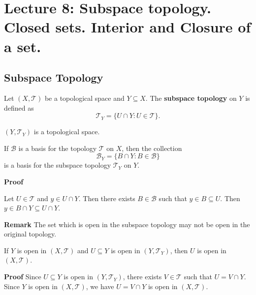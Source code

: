\documentclass[main.tex]{subfiles}
\begin{document}
\pagestyle{plain}
\setcounter{chapter}{7}

\chapter{Lecture 8: Subspace topology. Closed sets. Interior and Closure of a set. }
\label{chap:Lecture8}

\section{Subspace Topology}
\begin{definition}
    Let \((X, \mathcal{T})\) be a topological space and \(Y \subseteq X\). The \textbf{subspace topology} on \(Y\) is defined as
    \[
        \mathcal{T}_Y = \{ U \cap Y : U \in \mathcal{T} \}.
    \]
\end{definition}
\begin{property}
    $(Y, \mathcal{T}_Y)$ is a topological space.
\end{property}
\begin{lemma}
    If $\mathcal{B}$ is a basis for the topology $\mathcal{T}$ on $X$, then the collection
    \[
        \mathcal{B}_Y = \{ B \cap Y : B \in \mathcal{B} \}
    \]
    is a basis for the subspace topology $\mathcal{T}_Y$ on $Y$.
\end{lemma}

\par \noindent \textbf{Proof} 
\par Let $U \in \mathcal{T}$ and $y\in U \cap Y$. Then there exists $B \in \mathcal{B}$ such that $y \in B \subseteq U$. Then $y \in B \cap Y \subseteq U \cap Y$. 

\par \noindent \textbf{Remark} The set which is open in the subspace topology may not be open in the original topology.

\begin{property}
    If $Y$ is open in $(X, \mathcal{T})$ and $U \subseteq Y$ is open in $(Y, \mathcal{T}_Y)$, then $U$ is open in $(X, \mathcal{T})$. 
\end{property}
\par \noindent \textbf{Proof} Since $U \subseteq Y$ is open in $(Y, \mathcal{T}_Y)$, there exists $V \in \mathcal{T}$ such that $U = V \cap Y$. Since $Y$ is open in $(X, \mathcal{T})$, we have $U = V \cap Y$ is open in $(X, \mathcal{T})$.
\end{document}
